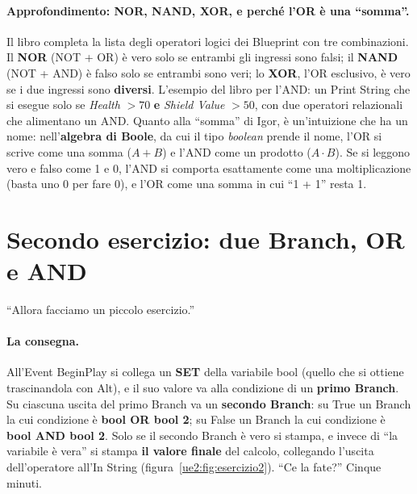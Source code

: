\paragraph{Approfondimento: NOR, NAND, XOR, e perché l'OR è una ``somma''.} Il libro
completa la lista degli operatori logici dei Blueprint con tre combinazioni. Il
\textbf{NOR} (NOT + OR) è vero solo se entrambi gli ingressi sono falsi; il \textbf{NAND}
(NOT + AND) è falso solo se entrambi sono veri; lo \textbf{XOR}, l'OR esclusivo, è vero
se i due ingressi sono \textbf{diversi}. L'esempio del libro per l'AND: un Print String
che si esegue solo se \emph{Health} $> 70$ \textbf{e} \emph{Shield Value} $> 50$, con
due operatori relazionali che alimentano un AND. Quanto alla ``somma'' di Igor, è
un'intuizione che ha un nome: nell'\textbf{algebra di Boole}, da cui il tipo
\emph{boolean} prende il nome, l'OR si scrive come una somma ($A + B$) e l'AND come un
prodotto ($A \cdot B$). Se si leggono vero e falso come 1 e 0, l'AND si comporta
esattamente come una moltiplicazione (basta uno 0 per fare 0), e l'OR come una somma
in cui ``1 + 1'' resta 1.

\section{Secondo esercizio: due Branch, OR e AND}
\label{ue2:sec:esercizio2}

``Allora facciamo un piccolo esercizio.''

\paragraph{La consegna.} All'Event BeginPlay si collega un \textbf{SET} della variabile
bool (quello che si ottiene trascinandola con Alt), e il suo valore va alla condizione
di un \textbf{primo Branch}. Su ciascuna uscita del primo Branch va un \textbf{secondo
Branch}: su True un Branch la cui condizione è \textbf{bool OR bool 2}; su False un
Branch la cui condizione è \textbf{bool AND bool 2}. Solo se il secondo Branch è vero si
stampa, e invece di ``la variabile è vera'' si stampa \textbf{il valore finale} del
calcolo, collegando l'uscita dell'operatore all'In String
(figura~\ref{ue2:fig:esercizio2}). ``Ce la fate?'' Cinque minuti.

